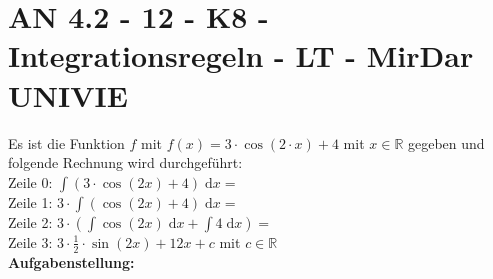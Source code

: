 \section{AN 4.2 - 12 - K8 - Integrationsregeln - LT - MirDar UNIVIE}

\begin{beispiel}[AN 4.2]{1}
Es ist die Funktion $f$ mit $f(x)=3 \cdot \cos(2 \cdot x) +4$ mit $x \in \mathbb{R}$ gegeben und folgende Rechnung wird durchgeführt: \\


Zeile 0: \hspace{1cm} $\displaystyle \int (3 \cdot \cos(2x) + 4)\; \text{d} x =$ \\

Zeile 1: \hspace{1cm} $3 \cdot \displaystyle \int ( \cos(2x) + 4)\; \text{d} x =$ \\

Zeile 2: \hspace{1cm} $3 \cdot \left( \displaystyle \int \cos(2x) \;  \text{d}x + \int 4 \; \text{d} x \right) = $ \\

Zeile 3: \hspace{1cm} $3\cdot \displaystyle \frac{1}{2} \cdot \sin(2x) + 12x +c$ mit $c\in \mathbb{R}$ \\

\textbf{Aufgabenstellung:} \\

\end{beispiel}